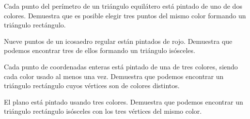 \documentclass[11pt]{scrartcl}
\begin{document}
\begin{problem}[IMO 1983]
Cada punto del perímetro de un triángulo equilátero está pintado de uno de dos colores. Demuestra que es posible elegir tres puntos del mismo color formando un triángulo rectángulo.
\end{problem}

\begin{problem}
Nueve puntos de un icosaedro regular están pintados de rojo. Demuestra que podemos encontrar tres de ellos formando un triángulo isósceles.
\end{problem}

\begin{problem}[Rusia 2004]
Cada punto de coordenadas enteras está pintado de una de tres colores, siendo cada color usado al menos una vez. Demuestra que podemos encontrar un triángulo rectángulo cuyos vértices son de colores distintos.
\end{problem}

\begin{problem}
El plano está pintado usando tres colores. Demuestra que podemos encontrar un triángulo rectángulo isósceles con los tres vértices del mismo color.
\end{problem}



%
\end{document}
